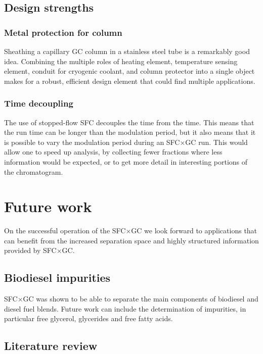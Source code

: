 \subsection{Design strengths}

\subsubsection{Metal protection for column}

Sheathing a capillary GC column in a stainless steel tube is a remarkably good
idea. Combining the multiple roles of heating element, temperature sensing
element, conduit for cryogenic coolant, and column protector into a single
object makes for a robust, efficient design element that could find multiple
applications.

\subsubsection{Time decoupling}

The use of stopped-flow SFC decouples the \oneD time from the \twoD time. This
means that the \twoD run time can be longer than the modulation period, but it
also means that it is possible to vary the modulation period during an SFC×GC
run. This would allow one to speed up analysis, by collecting fewer fractions
where less information would be expected, or to get more detail in interesting
portions of the \oneD chromatogram.

\section{Future work}

On the successful operation of the SFC×GC we look forward to applications that
can benefit from the increased separation space and highly structured
information provided by SFC×GC.

\subsection{Biodiesel impurities}

SFC×GC was shown to be able to separate the main components of biodiesel and
diesel fuel blends. Future work can include the determination of impurities, in
particular free glycerol, glycerides and free fatty acids.

\subsection{Literature review}

